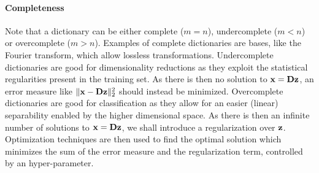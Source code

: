 \paragraph{Completeness}
Note that a dictionary can be either complete ($m=n$), undercomplete ($m<n$) or overcomplete ($m>n$).
Examples of complete dictionaries are bases, like the Fourier transform, which allow lossless transformations.
Undercomplete dictionaries are good for dimensionality reductions as they exploit the statistical regularities present in the training set. As there is then no solution to $\mathbf{x} = \mathbf{D}\mathbf{z}$, an error measure like $\| \mathbf{x} - \mathbf{D}\mathbf{z} \|_2^2$ should instead be minimized.
Overcomplete dictionaries are good for classification as they allow for an easier (linear) separability enabled by the higher dimensional space. As there is then an infinite number of solutions to $\mathbf{x} = \mathbf{D}\mathbf{z}$, we shall introduce a regularization over $\mathbf{z}$. Optimization techniques are then used to find the optimal solution which minimizes the sum of the error measure and the regularization term, controlled by an hyper-parameter.

